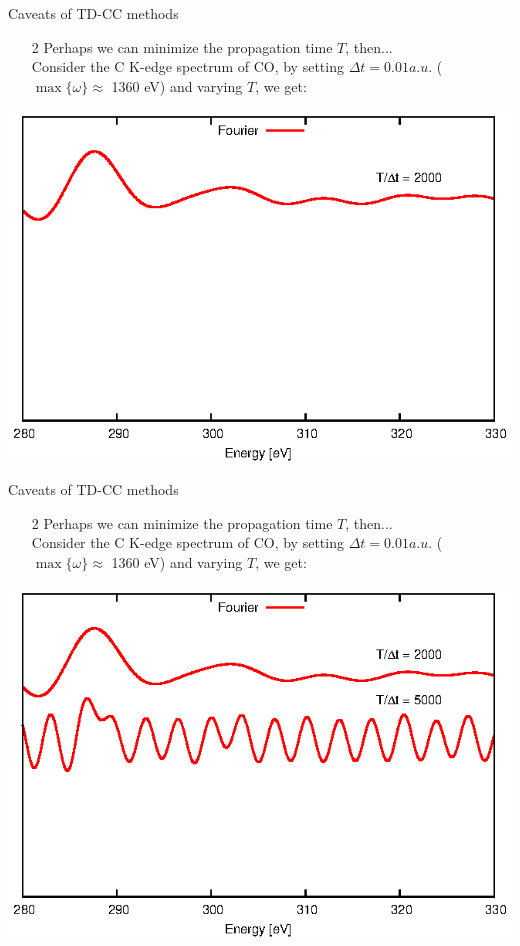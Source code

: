 \documentclass{beamer}
\begin{document}
\begin{frame}{Caveats of TD-CC methods}
\begin{enumerate}
\item[2]{Perhaps we can minimize the propagation time $T$, then...}\\
\vspace{5pt}
Consider the C K-edge spectrum of CO, by setting $\Delta t = 0.01 a.u.$ ($\max\{\omega\} \approx$ 1360 eV) and varying $T$, we get: 
\end{enumerate}
\begin{center}
 \includegraphics[scale=1.0]{figures/conv_anim_1.eps}
\end{center}
\end{frame}

\begin{frame}{Caveats of TD-CC methods}
\begin{enumerate}
\item[2]{Perhaps we can minimize the propagation time $T$, then...}\\
\vspace{5pt}
Consider the C K-edge spectrum of CO, by setting $\Delta t = 0.01 a.u.$ ($\max\{\omega\} \approx$ 1360 eV) and varying $T$, we get: 
\end{enumerate}
\begin{center}
 \includegraphics[scale=1.0]{figures/conv_anim_2.eps}
\end{center}
\end{frame}
\end{document}
